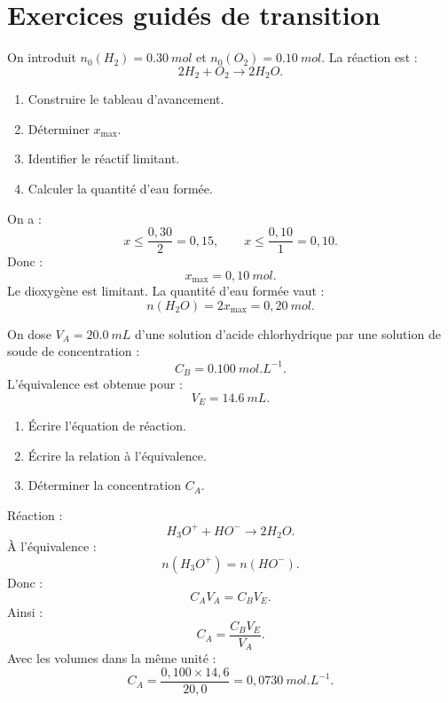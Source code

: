 \documentclass[11pt,a4paper]{article}
\begin{document}
\section{Exercices guidés de transition}

\begin{exercice}
On introduit $n_0(H_2)=\SI{0.30}{mol}$ et $n_0(O_2)=\SI{0.10}{mol}$.  
La réaction est :
\[
2H_2+O_2\longrightarrow 2H_2O.
\]

\begin{enumerate}
  \item Construire le tableau d'avancement.
  \item Déterminer $x_{\max}$.
  \item Identifier le réactif limitant.
  \item Calculer la quantité d'eau formée.
\end{enumerate}

\begin{methode}[Correction]
On a :
\[
x\leq \frac{0{,}30}{2}=0{,}15,
\qquad
x\leq \frac{0{,}10}{1}=0{,}10.
\]
Donc :
\[
x_{\max}=0{,}10\ \si{mol}.
\]
Le dioxygène est limitant.  
La quantité d'eau formée vaut :
\[
n(H_2O)=2x_{\max}=0{,}20\ \si{mol}.
\]
\end{methode}
\end{exercice}

\begin{exercice}
On dose $V_A=\SI{20.0}{mL}$ d'une solution d'acide chlorhydrique par une solution de soude de concentration :
\[
C_B=\SI{0.100}{mol.L^{-1}}.
\]
L'équivalence est obtenue pour :
\[
V_E=\SI{14.6}{mL}.
\]

\begin{enumerate}
  \item Écrire l'équation de réaction.
  \item Écrire la relation à l'équivalence.
  \item Déterminer la concentration $C_A$.
\end{enumerate}

\begin{methode}[Correction]
Réaction :
\[
H_3O^+ + HO^- \longrightarrow 2H_2O.
\]
À l'équivalence :
\[
n(H_3O^+)=n(HO^-).
\]
Donc :
\[
C_AV_A=C_BV_E.
\]
Ainsi :
\[
C_A=\frac{C_BV_E}{V_A}.
\]
Avec les volumes dans la même unité :
\[
C_A=\frac{0{,}100\times14{,}6}{20{,}0}
=0{,}0730\ \si{mol.L^{-1}}.
\]
\end{methode}
\end{exercice}
\end{document}
